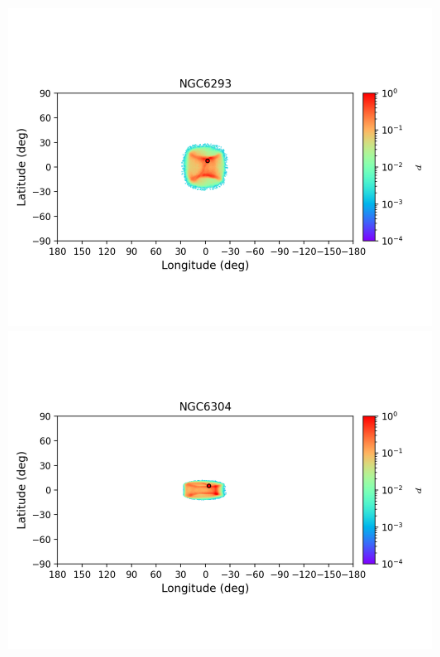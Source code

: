 \begin{figure}
\begin{center}
                \includegraphics[clip=true, trim = 0mm 20mm 0mm 10mm, width=1\columnwidth]{images/error_plots_NGC6293.png}
                \includegraphics[clip=true, trim = 0mm 20mm 0mm 10mm, width=1\columnwidth]{images/error_plots_NGC6304.png}
                

\end{center}
\end{figure}
